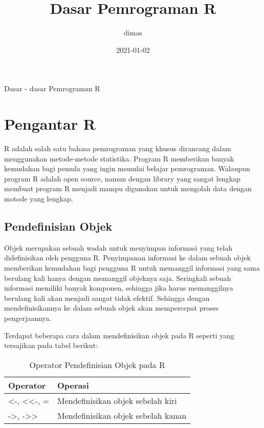 \documentclass[
]{book}
\title{Dasar Pemrograman R}
\author{dimas}
\date{2021-01-02}
\begin{document}
\maketitle

{
\setcounter{tocdepth}{1}
\tableofcontents
}
Dasar - dasar Pemrograman R

\hypertarget{pengantar-r}{%
\chapter{Pengantar R}\label{pengantar-r}}

R adalah salah satu bahasa pemrograman yang khusus dirancang dalam menggunakan metode-metode statistika. Program R memberikan banyak kemudahan bagi pemula yang ingin memulai belajar pemrograman. Walaupun program R adalah open source, namun dengan library yang sangat lengkap membuat program R menjadi mampu digunakan untuk mengolah data dengan motode yang lengkap.

\hypertarget{pendefinisian-objek}{%
\section{Pendefinisian Objek}\label{pendefinisian-objek}}

Objek merupakan sebuah wadah untuk menyimpan informasi yang telah didefinisikan oleh pengguna R. Penyimpanan informasi ke dalam sebuah objek memberikan kemudahan bagi pengguna R untuk memanggil informasi yang sama berulang kali hanya dengan memanggil objeknya saja. Seringkali sebuah informasi memiliki banyak komponen, sehingga jika harus memanggilnya berulang kali akan menjadi sangat tidak efektif. Sehingga dengan mendefinisikannya ke dalam sebuah objek akan mempercepat proses pengerjaannya.

Terdapat beberapa cara dalam mendefinisikan objek pada R seperti yang tersajikan pada tabel berikut:

\begin{table}

\caption{\label{tab:unnamed-chunk-1}Operator Pendefinisian Objek pada R}
\centering
\begin{tabular}[t]{ll}
\toprule
Operator & Operasi\\
\midrule
<-, <<-, = & Mendefinisikan objek sebelah kiri\\
->, ->> & Mendefinisikan objek sebelah kanan\\
\bottomrule
\end{tabular}
\end{table}
\end{document}
